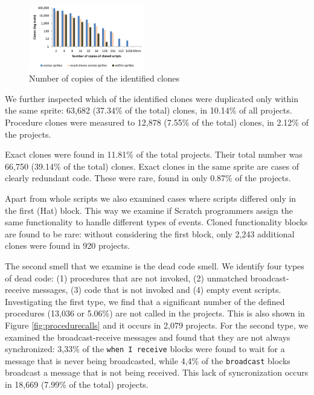 \documentclass{sig-alternate}
\begin{document}
\begin{figure}
	\centering
	\includegraphics[width=0.45\textwidth]{fig/charts/11clonescopies}
	\vspace{-1em}
	\caption{Number of copies of the identified clones}
	\label{fig:clonescopies}
\end{figure}

We further inspected which of the identified clones were duplicated only within the same sprite: 63,682 (37.34\% of the total) clones, in 10.14\% of all projects. Procedure clones were measured to 12,878 (7.55\% of the total) clones, in 2.12\% of the projects.

Exact clones were found in 11.81\% of the total projects. Their total number was 66,750 (39.14\% of the total) clones. Exact clones in the same sprite are cases of clearly redundant code. These were rare, found in only 0.87\% of the projects.

Apart from whole scripts we also examined cases where scripts differed only in the first (Hat) block. This way we examine if Scratch programmers assign the same functionality to handle different types of events. Cloned functionality blocks are found to be rare: without considering the first block, only 2,243 additional clones were found in 920 projects.

The second smell that we examine is the dead code smell. We identify four types of dead code: (1) procedures that are not invoked, (2) unmatched broadcast-receive messages, (3) code that is not invoked and (4) empty event scripts. Investigating the first type, we find that a significant number of the defined procedures (13,036 or 5.06\%) are not called in the projects. This is also shown in Figure \ref{fig:procedurecalls} and it occurs in 2,079 projects. For the second type, we examined the broadcast-receive messages and found that they are not always synchronized: 3,33\% of the \texttt{when I receive} blocks were found to wait for a message that is never being broadcasted, while 4,4\% of the \texttt{broadcast} blocks broadcast a message that is not being received. This lack of syncronization occurs in 18,669 (7.99\% of the total) projects.
\end{document}
